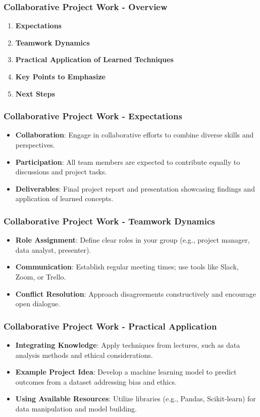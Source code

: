 \documentclass[aspectratio=169]{beamer}
\begin{document}
\begin{frame}[fragile]
    \frametitle{Collaborative Project Work - Overview}
    \begin{enumerate}
        \item \textbf{Expectations}
        \item \textbf{Teamwork Dynamics}
        \item \textbf{Practical Application of Learned Techniques}
        \item \textbf{Key Points to Emphasize}
        \item \textbf{Next Steps}
    \end{enumerate}
\end{frame}

\begin{frame}[fragile]
    \frametitle{Collaborative Project Work - Expectations}
    \begin{itemize}
        \item \textbf{Collaboration}: Engage in collaborative efforts to combine diverse skills and perspectives.
        \item \textbf{Participation}: All team members are expected to contribute equally to discussions and project tasks.
        \item \textbf{Deliverables}: Final project report and presentation showcasing findings and application of learned concepts.
    \end{itemize}
\end{frame}

\begin{frame}[fragile]
    \frametitle{Collaborative Project Work - Teamwork Dynamics}
    \begin{itemize}
        \item \textbf{Role Assignment}: Define clear roles in your group (e.g., project manager, data analyst, presenter).
        \item \textbf{Communication}: Establish regular meeting times; use tools like Slack, Zoom, or Trello.
        \item \textbf{Conflict Resolution}: Approach disagreements constructively and encourage open dialogue.
    \end{itemize}
\end{frame}

\begin{frame}[fragile]
    \frametitle{Collaborative Project Work - Practical Application}
    \begin{itemize}
        \item \textbf{Integrating Knowledge}: Apply techniques from lectures, such as data analysis methods and ethical considerations.
        \item \textbf{Example Project Idea}: Develop a machine learning model to predict outcomes from a dataset addressing bias and ethics.
        \item \textbf{Using Available Resources}: Utilize libraries (e.g., Pandas, Scikit-learn) for data manipulation and model building.
    \end{itemize}
\end{frame}
\end{document}
